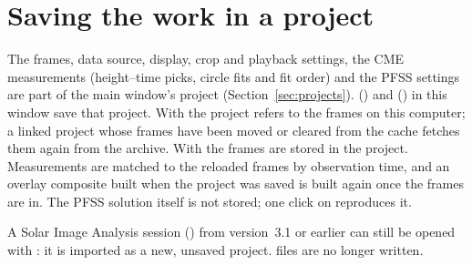 \section{Saving the work in a project}
\label{sec:solar-sessions}

The frames, data source, display, crop and playback settings, the CME measurements
(height--time picks, circle fits and fit order) and the PFSS settings are part of the main
window's project (Section~\ref{sec:projects}).  ()
and  () in this window save that project. With
 the project refers to the frames on this computer; a linked project whose
frames have been moved or cleared from the cache fetches them again from the archive. With
 the frames are stored in the project. Measurements are matched to the
reloaded frames by observation time, and an overlay composite built when the project was saved
is built again once the frames are in. The PFSS solution itself is not stored; one click on
 reproduces it.

A Solar Image Analysis session () from version~3.1 or earlier can still be
opened with : it is imported as a new, unsaved project.
 files are no longer written.
